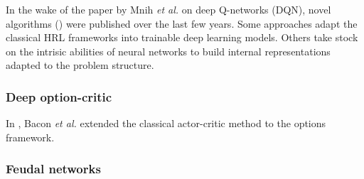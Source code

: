 \documentclass{article}
\begin{document}
In the wake of the paper by Mnih \textit{et al.} \cite{mnih_human-level_2015} on deep Q-networks (DQN), novel algorithms (\cite{kulkarni_hierarchical_2016, bacon_option-critic_2016, alexander_strategic_2016, casanueva_feudal_2018, florensa_stochastic_2017}) were published over the last few years. Some approaches adapt the classical HRL frameworks into trainable deep learning models. Others take stock on the intrisic abilities of neural networks to build internal representations adapted to the problem structure.

\subsubsection{Deep option-critic}

In \cite{bacon_option-critic_2016}, Bacon \textit{et al.} extended the classical actor-critic method to the options framework.

\subsubsection{Feudal networks}



\small


\end{document}
